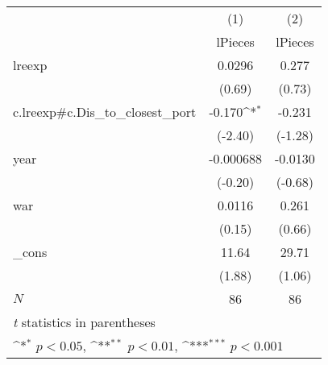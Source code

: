 {
\def\sym#1{\ifmmode^{#1}\else\(^{#1}\)\fi}
\begin{tabular}{l*{2}{c}}
\hline\hline
            &\multicolumn{1}{c}{(1)}&\multicolumn{1}{c}{(2)}\\
            &\multicolumn{1}{c}{lPieces}&\multicolumn{1}{c}{lPieces}\\
\hline
lreexp      &      0.0296         &       0.277         \\
            &      (0.69)         &      (0.73)         \\
[1em]
c.lreexp#c.Dis\_to\_closest\_port&      -0.170\sym{*}  &      -0.231         \\
            &     (-2.40)         &     (-1.28)         \\
[1em]
year        &   -0.000688         &     -0.0130         \\
            &     (-0.20)         &     (-0.68)         \\
[1em]
war         &      0.0116         &       0.261         \\
            &      (0.15)         &      (0.66)         \\
[1em]
\_cons      &       11.64         &       29.71         \\
            &      (1.88)         &      (1.06)         \\
\hline
\(N\)       &          86         &          86         \\
\hline\hline
\multicolumn{3}{l}{\footnotesize \textit{t} statistics in parentheses}\\
\multicolumn{3}{l}{\footnotesize \sym{*} \(p<0.05\), \sym{**} \(p<0.01\), \sym{***} \(p<0.001\)}\\
\end{tabular}
}
